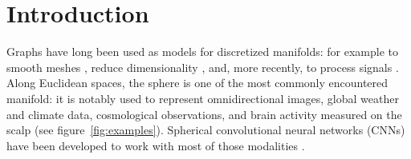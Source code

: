 \documentclass{article} %
\newcommand{\figref}[1]{figure~\ref{fig:#1}}
\newcommand{\1}{\b{1}}              %
\newcommand{\0}{\b{0}}              %
\newcommand{\todo}[1]{{\color[rgb]{.6,.1,.6}{#1}}}
\begin{document}
\section{Introduction}




Graphs have long been used as models for discretized manifolds: for example to smooth meshes \citep{taubin1996meshsmoothing}, reduce dimensionality \citep{belkin2003laplacian}, and, more recently, to process signals \citep{shuman2013gsp}.
Along
Euclidean spaces, the sphere is one of the most commonly encountered manifold: it is notably used to represent omnidirectional images, global weather and climate data, cosmological observations, and brain activity measured on the scalp (see \figref{examples}).
Spherical convolutional neural networks (CNNs) have been developed to work with most of those modalities \citep{cohen2018sphericalcnn, esteves2017sphericalcnn, perraudin2018deepsphere, khasanova2017graphomni, boomsma2017sphericalcnn, su2017sphericalcnn, coors2018sphericalcnn,
jiang2019sphericalcnn}.
\end{document}
